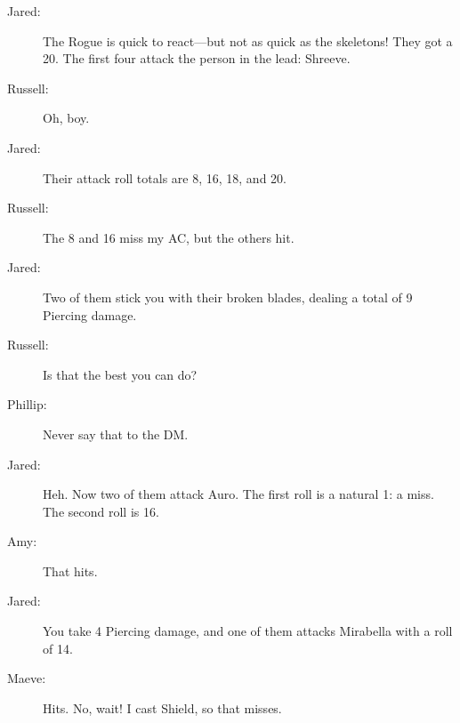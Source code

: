 \documentclass[10pt,a4paper,twoside,bg=print,twocolumn,openany,nodeprecatedcode]{dndbook}
\begin{document}
{\par \vspace { 9pt plus 3pt minus 3pt } \noindent  {} \nopagebreak }

\begin{description}
\item[Jared:]
The Rogue is quick to react—but not as quick as the skeletons! They got a 20. The first four attack the person in the lead: Shreeve.
\end{description}


\begin{description}
\item[Russell:]
Oh, boy.
\end{description}

{\par \vspace { 9pt plus 3pt minus 3pt } \noindent  {} \nopagebreak }

\begin{description}
\item[Jared:]
Their attack roll totals are 8, 16, 18, and 20.
\item[Russell:]
The 8 and 16 miss my AC, but the others hit.
\item[Jared:]
Two of them stick you with their broken blades, dealing a total of 9 Piercing damage.
\end{description}


\begin{description}
\item[Russell:]
Is that the best you can do?
\item[Phillip:]
Never say that to the DM.
\item[Jared:]
Heh. Now two of them attack Auro. The first roll is a natural 1: a miss. The second roll is 16.
\item[Amy:]
That hits.
\item[Jared:]
You take 4 Piercing damage, and one of them attacks Mirabella with a roll of 14.
\end{description}

{\par \vspace { 9pt plus 3pt minus 3pt } \noindent  {} \nopagebreak }

\begin{description}
\item[Maeve:]
Hits. No, wait! I cast Shield, so that misses.
\end{description}
\end{document}
